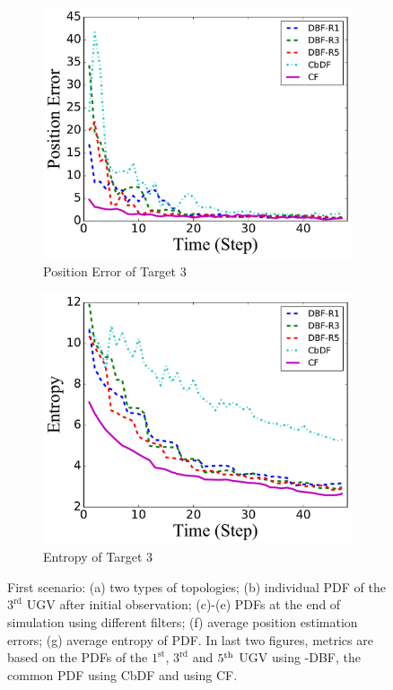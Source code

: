 \begin{figure}
		\begin{subfigure}[b]{0.23\textwidth}
			\includegraphics[width=\textwidth]{figures/hetero_mov_sen_mov_tar_pos_err_noise_sin}
			\caption{Position Error of Target $3$}\label{fig:sin_pos_err}
		\end{subfigure}
		\begin{subfigure}[b]{0.23\textwidth}
			\includegraphics[width=\textwidth]{figures/hetero_mov_sen_mov_tar_entropy_noise_sin}
			\caption{Entropy of Target $3$}\label{fig:sin_ent}
		\end{subfigure}		
		\caption{First scenario: (a) two types of topologies; (b) individual PDF of the $3^\text{rd}$ UGV after initial observation; (c)-(e) PDFs at the end of simulation using different filters; (f) average position estimation errors; (g) average entropy of PDF. In last two figures, metrics are based on the PDFs of the $1^\text{st}$, $3^\text{rd}$ and $5^\text{th}$ UGV using \proto-DBF, the common PDF using CbDF and using CF.}
		\label{fig:metrics}
	\end{figure}
	
